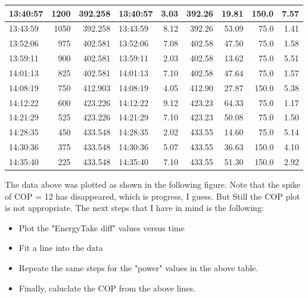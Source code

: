 \begin{table}[ht!]
\begin{adjustbox}{max width=\textwidth}
\begin{tabular}{|l|r|r|l|r|r|r|r|r|}
13:40:57 &               1200 &         392.258 & 13:40:57 &       3.03 &         392.26 &   19.81 &            150.0 & 7.57 \\ \hline
13:43:59 &               1050 &         392.258 & 13:43:59 &       8.12 &         392.26 &   53.09 &             75.0 & 1.41 \\ \hline
13:52:06 &                975 &         402.581 & 13:52:06 &       7.08 &         402.58 &   47.50 &             75.0 & 1.58 \\ \hline
13:59:11 &                900 &         402.581 & 13:59:11 &       2.03 &         402.58 &   13.62 &             75.0 & 5.51 \\ \hline
14:01:13 &                825 &         402.581 & 14:01:13 &       7.10 &         402.58 &   47.64 &             75.0 & 1.57 \\ \hline
14:08:19 &                750 &         412.903 & 14:08:19 &       4.05 &         412.90 &   27.87 &            150.0 & 5.38 \\ \hline
14:12:22 &                600 &         423.226 & 14:12:22 &       9.12 &         423.23 &   64.33 &             75.0 & 1.17 \\ \hline
14:21:29 &                525 &         423.226 & 14:21:29 &       7.10 &         423.23 &   50.08 &             75.0 & 1.50 \\ \hline
14:28:35 &                450 &         433.548 & 14:28:35 &       2.02 &         433.55 &   14.60 &             75.0 & 5.14 \\ \hline
14:30:36 &                375 &         433.548 & 14:30:36 &       5.07 &         433.55 &   36.63 &            150.0 & 4.10 \\ \hline
14:35:40 &                225 &         433.548 & 14:35:40 &       7.10 &         433.55 &   51.30 &            150.0 & 2.92 \\ \hline

\end{tabular}
\label{table:EnergyTake Diff}
\end{adjustbox}
\end{table}

\newpage

The data above was plotted as shown in the following figure. Note that the spike of COP = 12 has disappeared, which is progress, I guess. But Still the COP plot is not appropriate. The next steps that I have in mind is the following:

\begin{itemize}
    \item Plot the "EnergyTake diff" values versus time
    \item Fit a line into the data
    \item Repeate the same steps for the "power" values in the above table.
    \item Finally, caluclate the COP from the above lines.
\end{itemize}

